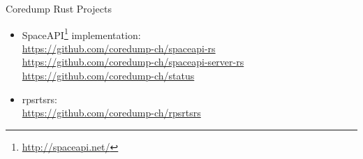 \begin{frame}{Coredump Rust Projects}
\begin{itemize}
    \item SpaceAPI\footnote{\url{http://spaceapi.net/}} implementation:\\
      \url{https://github.com/coredump-ch/spaceapi-rs}\\
      \url{https://github.com/coredump-ch/spaceapi-server-rs}\\
      \url{https://github.com/coredump-ch/status}
    \item rpsrtsrs:\\
      \url{https://github.com/coredump-ch/rpsrtsrs}
\end{itemize}
\end{frame}
